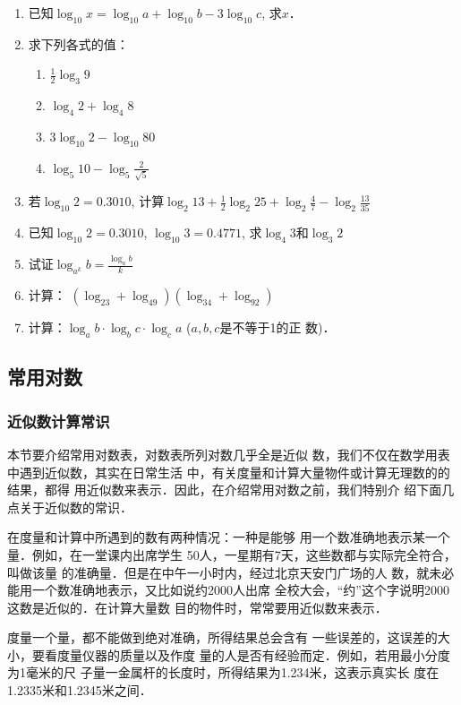 \begin{enumerate}
\item 已知$\log_{10} x=\log_{10} a+\log_{10} b-3\log_{10} c$, 求$x$．
\item 求下列各式的值：
\begin{multicols}{2}
\begin{enumerate}
    \item $\frac{1}{2}\log_{3} 9$
    \item $\log_{4} 2+\log_{4} 8$
    \item $3\log_{10} 2-\log_{10} 80$
    \item $\log_{5} 10-\log_{5}\frac{2}{\sqrt{5}} $
\end{enumerate}
\end{multicols}
\item 若$\log_{10} 2=0.3010$,
计算$\log_{2} 13+\frac{1}{2}\log_{2} 25+\log_{2} \frac{4}{7}-\log_{2}\frac{13}{35} $
\item 已知$\log_{10} 2=0.3010$, $\log_{10}3=0.4771$,
求$\log_4 3$和$\log_3 2$

\item  试证$\log_{a^k}b=\frac{\log_ab}{k}$

\item 计算：
$(\log_23+\log_49)(\log_34 +\log_92)$
\item 计算：$\log_ab\cdot \log_b c\cdot \log_ca$ ($a,b,c$是不等于1的正
数)．
\end{enumerate}  

\subsection{常用对数}
\subsubsection{近似数计算常识}
本节要介绍常用对数表，对数表所列对数几乎全是近似
数，我们不仅在数学用表中遇到近似数，其实在日常生活
中，有关度量和计算大量物件或计算无理数的的结果，都得
用近似数来表示．因此，在介绍常用对数之前，我们特别介
绍下面几点关于近似数的常识．

在度量和计算中所遇到的数有两种情况：一种是能够
用一个数准确地表示某一个量．例如，在一堂课内出席学生
50人，一星期有7天，这些数都与实际完全符合，叫做该量
的准确量．但是在中午一小时内，经过北京天安门广场的人
数，就未必能用一个数准确地表示，又比如说约2000人出席
全校大会，“约”这个字说明2000这数是近似的．在计算大量数
目的物件时，常常要用近似数来表示．

度量一个量，都不能做到绝对准确，所得结果总会含有
一些误差的，这误差的大小，要看度量仪器的质量以及作度
量的人是否有经验而定．例如，若用最小分度为1毫米的尺
子量一金属杆的长度时，所得结果为1.234米，这表示真实长
度在1.2335米和1.2345米之间．

